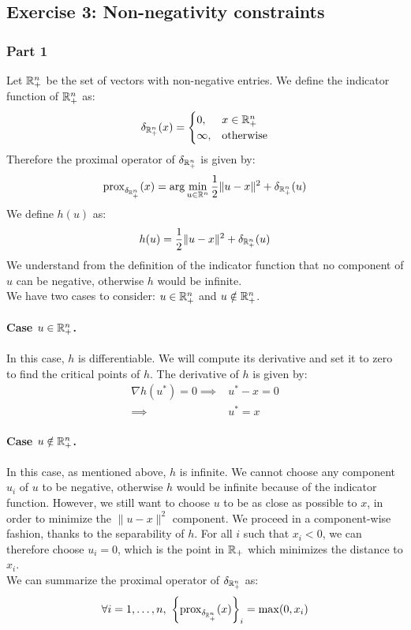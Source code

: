 \documentclass[12pt]{article}
\newcommand{\prox}{\operatorname{prox}}
\begin{document}
\subsection{Exercise 3: Non-negativity constraints}
\subsubsection{Part 1}
\label{sec:part1}
Let $\mathbb{R}_+^n$ be the set of vectors with non-negative entries. We define the indicator function of $\mathbb{R}_+^n$ as:
\begin{equation*}
  \delta_{\mathbb{R}_+^n} (x) =
  \begin{cases}
    0,      & x \in \mathbb{R}_+^n     \\
    \infty, & \text{otherwise}
  \end{cases}
\end{equation*}
Therefore the proximal operator of $\delta_{\mathbb{R}_+^n}$ is given by:
\begin{equation*}
  \prox_{\delta_{\R_+^n}}(x) = \arg\min_{u \in \R^n} \frac{1}{2}\|u-x\|^2 + \delta_{\R_+^n} (u)
\end{equation*}
We define $h(u)$ as:
\begin{equation*}
  h(u) = \frac{1}{2}\|u-x\|^2 + \delta_{\mathbb{R}_+^n} (u)
\end{equation*}
We understand from the definition of the indicator function that no component of $u$ can be negative, otherwise $h$ would be infinite. \\
We have two cases to consider: $u \in \mathbb{R}_+^n$ and $u \notin \mathbb{R}_+^n$.
\paragraph{Case $u \in \mathbb{R}_+^n$.}
In this case, $h$ is differentiable. We will compute its derivative and set it to zero to find the critical points of $h$. The derivative of $h$ is given by:
\begin{align*}
  \nabla h(u^*) = 0
  \implies &
  u^* - x = 0 \\
  \implies &
  u^* = x
\end{align*}
\paragraph{Case $u \notin \mathbb{R}_+^n$.}
In this case, as mentioned above, $h$ is infinite. We cannot choose any component $u_i$ of $u$ to be negative, otherwise $h$ would be infinite because of the indicator function. However, we still want to choose $u$ to be as close as possible to $x$, in order to minimize the $\|u-x\|^2$ component. We proceed in a component-wise fashion, thanks to the separability of $h$. For all $i$ such that $x_i < 0$, we can therefore choose $u_i = 0$, which is the point in $\mathbb{R}_+$ which minimizes the distance to $x_i$. \\
We can summarize the proximal operator of $\delta_{\mathbb{R}_+^n}$ as:
\begin{equation*}
  \forall i=1, \ldots, n,\ \left\{\prox_{\delta_{\R_+^n}}(x)\right\}_i = \max(0, x_i)
\end{equation*}
\end{document}
